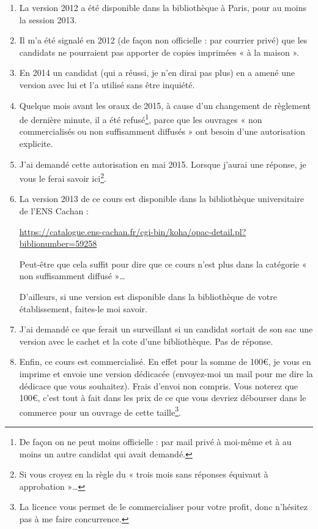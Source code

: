 \begin{enumerate}
    \item
        La version 2012 a été disponible dans la bibliothèque à Paris, pour au moins la session 2013.
    \item 
        Il m'a été signalé en 2012 (de façon non officielle : par courrier privé) que les candidats ne pourraient pas apporter de copies imprimées « à la maison ».
    \item
        En 2014 un candidat (qui a réussi, je n'en dirai pas plus) en a amené une version avec lui et l'a utilisé sans être inquiété.
    \item
        Quelque mois avant les oraux de 2015, à cause d'un changement de règlement de dernière minute, il a été refusé\footnote{De façon on ne peut moins officielle : par mail privé à moi-même et à au moins un autre candidat qui avait demandé.}, parce que les ouvrages « non commercialisés ou non suffisamment diffusés » ont besoin d'une autorisation explicite.
    \item
        J'ai demandé cette autorisation en mai 2015. Lorsque j'aurai une réponse, je vous le ferai savoir ici\footnote{Si vous croyez en la règle du « trois mois sans réponses équivaut à approbation »\ldots}.
    \item
        La version 2013 de ce cours est disponible dans la bibliothèque universitaire de l'ENS Cachan :
        \begin{center}
            \url{https://catalogue.ens-cachan.fr/cgi-bin/koha/opac-detail.pl?biblionumber=59258}
        \end{center}
        Peut-être que cela suffit pour dire que ce cours n'est plus dans la catégorie « non suffisamment diffusé »\ldots

        D'ailleurs, si une version est disponible dans la bibliothèque de votre établissement, faites-le moi savoir.
    \item
        J'ai demandé ce que ferait un surveillant si un candidat sortait de son sac une version avec le cachet et la cote d'une bibliothèque. Pas de réponse.
    \item
        Enfin, ce cours est commercialisé. En effet pour la somme de 100€, je vous en imprime et envoie une version dédicacée (envoyez-moi un mail pour me dire la dédicace que vous souhaitez). Frais d'envoi non compris. Vous noterez que 100€, c'est tout à fait dans les prix de ce que vous devriez débourser dans le commerce pour un ouvrage de cette taille\footnote{La licence vous permet de le commercialiser pour votre profit, donc n'hésitez pas à me faire concurrence.}.
\end{enumerate}

